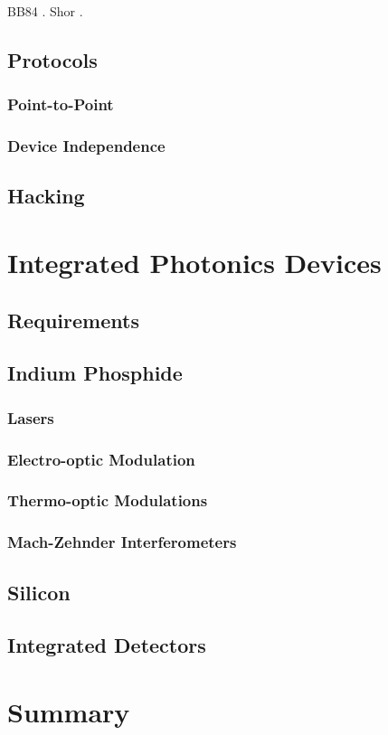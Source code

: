 BB84 \cite{BB84}. Shor \cite{shor1994}.

\subsection{Protocols}

\subsubsection*{Point-to-Point}

\subsubsection*{Device Independence}

\subsection{Hacking}

\section{Integrated Photonics Devices}

\subsection{Requirements}

\subsection{Indium Phosphide}

\subsubsection{Lasers}

\subsubsection{Electro-optic Modulation}

\subsubsection{Thermo-optic Modulations}

\subsubsection{Mach-Zehnder Interferometers}

\subsection{Silicon}

\subsection{Integrated Detectors}

\section{Summary}


